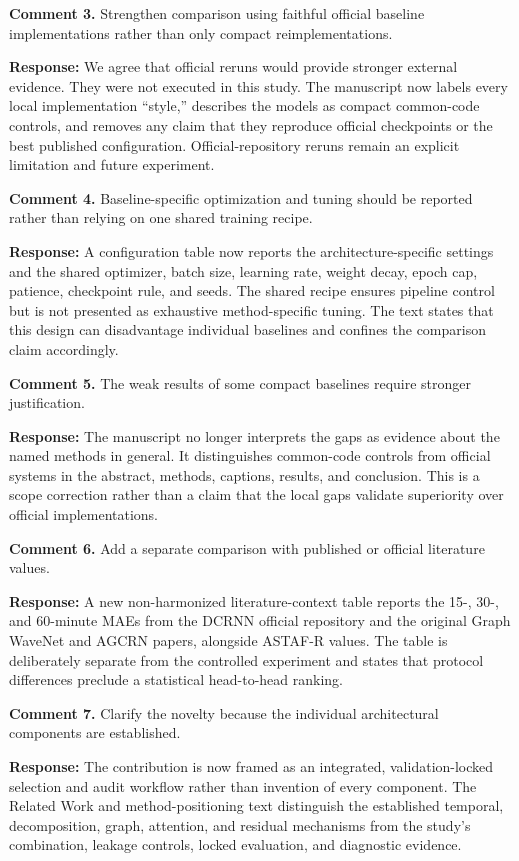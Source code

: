 \documentclass[11pt]{article}
\newcommand{\response}[1]{\par\noindent\textcolor{responseblue}{\textbf{Response:} #1}\par}
\begin{document}
\textbf{Comment 3.} Strengthen comparison using faithful official baseline implementations rather than only compact reimplementations.

\response{We agree that official reruns would provide stronger external evidence. They were not executed in this study. The manuscript now labels every local implementation ``style,'' describes the models as compact common-code controls, and removes any claim that they reproduce official checkpoints or the best published configuration. Official-repository reruns remain an explicit limitation and future experiment.}

\textbf{Comment 4.} Baseline-specific optimization and tuning should be reported rather than relying on one shared training recipe.

\response{A configuration table now reports the architecture-specific settings and the shared optimizer, batch size, learning rate, weight decay, epoch cap, patience, checkpoint rule, and seeds. The shared recipe ensures pipeline control but is not presented as exhaustive method-specific tuning. The text states that this design can disadvantage individual baselines and confines the comparison claim accordingly.}

\textbf{Comment 5.} The weak results of some compact baselines require stronger justification.

\response{The manuscript no longer interprets the gaps as evidence about the named methods in general. It distinguishes common-code controls from official systems in the abstract, methods, captions, results, and conclusion. This is a scope correction rather than a claim that the local gaps validate superiority over official implementations.}

\textbf{Comment 6.} Add a separate comparison with published or official literature values.

\response{A new non-harmonized literature-context table reports the 15-, 30-, and 60-minute MAEs from the DCRNN official repository and the original Graph WaveNet and AGCRN papers, alongside ASTAF-R values. The table is deliberately separate from the controlled experiment and states that protocol differences preclude a statistical head-to-head ranking.}

\textbf{Comment 7.} Clarify the novelty because the individual architectural components are established.

\response{The contribution is now framed as an integrated, validation-locked selection and audit workflow rather than invention of every component. The Related Work and method-positioning text distinguish the established temporal, decomposition, graph, attention, and residual mechanisms from the study's combination, leakage controls, locked evaluation, and diagnostic evidence.}
\end{document}
